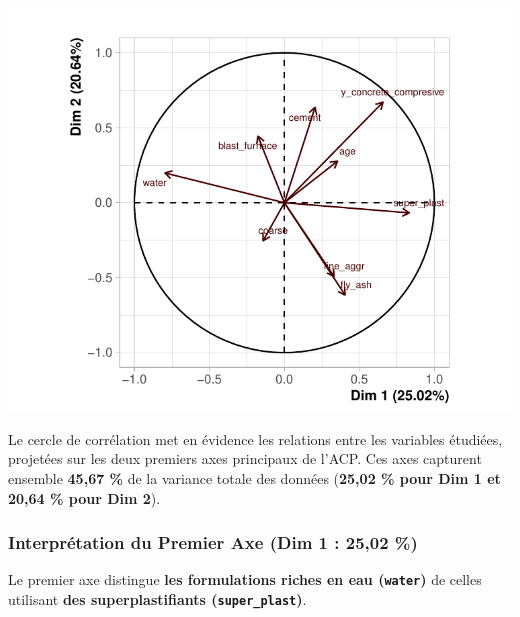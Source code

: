 \documentclass[
  12pt,
]{article}
\begin{document}
\begin{center}\includegraphics{rmd_final_files/figure-latex/unnamed-chunk-11-1} \end{center}

Le cercle de corrélation met en évidence les relations entre les
variables étudiées, projetées sur les deux premiers axes principaux de
l'ACP. Ces axes capturent ensemble \textbf{45,67 \%} de la variance
totale des données (\textbf{25,02 \% pour Dim 1 et 20,64 \% pour Dim
2}).

\subsubsection{Interprétation du Premier Axe (Dim 1 : 25,02
\%)}\label{interpruxe9tation-du-premier-axe-dim-1-2502}

Le premier axe distingue \textbf{les formulations riches en eau
(\texttt{water})} de celles utilisant \textbf{des superplastifiants
(\texttt{super\_plast})}.
\end{document}
